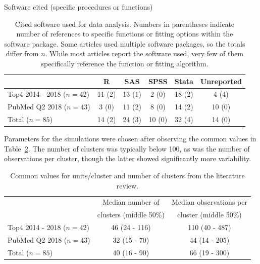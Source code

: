 \documentclass[Afour,times,sagev,doublespace]{sagej}
\begin{document}
\begin{table}[]
\centering
Software cited (specific procedures or functions)
 \begin{tabular}{ |l||c|c|c|c|c| } 
 \hline
      & R & SAS & SPSS & Stata & Unreported\\ 
     \hline
    Top4 2014 - 2018 ($n=42$) & 11 (2) & 13 (1) & 2 (0) & 18 (2) & 4 (4)  \\ 
    PubMed Q2 2018 ($n=43$) & 3 (0) & 11 (2) & 8 (0) & 14 (2) & 10 (0) \\ 
    \hline
    Total ($n=85$) & 14 (2) & 24 (3) & 10 (0) & 32 (4) & 14 (0) \\ 
\hline
 \end{tabular}
    \caption{Cited software used for data analysis. Numbers in parentheses indicate number of references to specific functions or fitting options within the software package. Some articles used multiple software packages, so the totals differ from $n$. While most articles report the software used, very few of them specifically reference the function or fitting algorithm.}
    \label{tab:lit_review}
\end{table}

Parameters for the simulations were chosen after observing the common values in Table~\ref{tab:lit_review_numbers}. The number of clusters was typically below 100, as was the number of observations per cluster, though the latter showed significantly more variability.

\begin{table}
\centering
 \begin{tabular}{ |l||c|c| } 
 \hline
      & Median number of & Median observations per \\ 
      & clusters (middle 50\%) & cluster (middle 50\%) \\ 
     \hline
    Top4 2014 - 2018 ($n=42$) & 46 (24 - 116) & 110 (40 - 487) \\ 
    PubMed Q2 2018 ($n=43$) & 32 (15 - 70) & 44 (14 - 205) \\ 
    \hline
    Total ($n=85$) & 40 (16 - 90) & 66 (19 - 300) \\
    \hline
 \end{tabular}
    \caption{Common values for units/cluster and number of clusters from the literature review.}
    \label{tab:lit_review_numbers}
\end{table}
\end{document}
